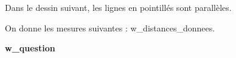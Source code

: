 \begin{exo}
    Dans le dessin suivant, les lignes en pointillés sont parallèles.

    On donne les mesures suivantes : {w_distances_donnees}.

    \textbf{{w_question}}
\end{exo}

\begin{center}

\end{center}

